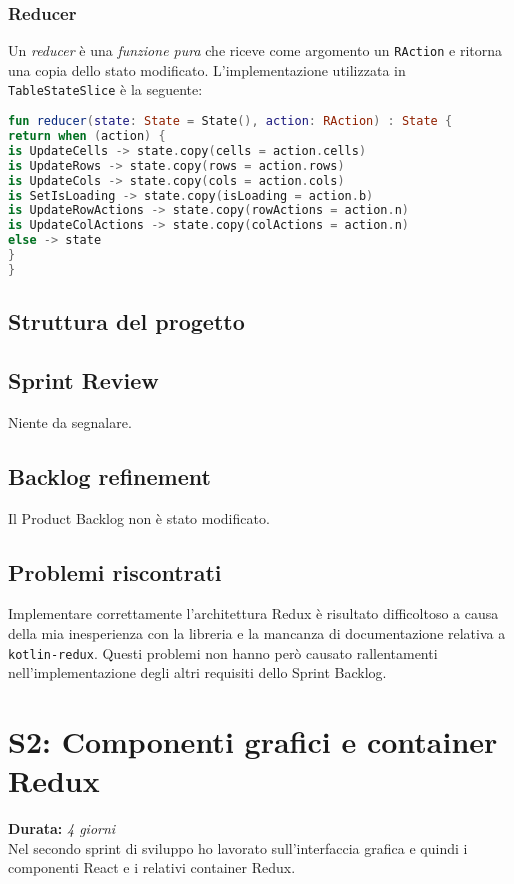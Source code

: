 \subsubsection{Reducer}
Un \emph{reducer} è una \emph{funzione pura} che riceve come argomento un \verb|RAction| e ritorna una copia dello stato modificato. L'implementazione utilizzata in \verb|TableStateSlice| è la seguente:
\begin{lstlisting}[caption={Reducer}, label={lst:bodycells}, language=Kotlin]
fun reducer(state: State = State(), action: RAction) : State {
return when (action) {
is UpdateCells -> state.copy(cells = action.cells)
is UpdateRows -> state.copy(rows = action.rows)
is UpdateCols -> state.copy(cols = action.cols)
is SetIsLoading -> state.copy(isLoading = action.b)
is UpdateRowActions -> state.copy(rowActions = action.n)
is UpdateColActions -> state.copy(colActions = action.n)
else -> state
}
}
\end{lstlisting}

\subsection{Struttura del progetto}
\subsection{Sprint Review}
Niente da segnalare.

\subsection{Backlog refinement}
Il Product Backlog non è stato modificato.

\subsection{Problemi riscontrati}
Implementare correttamente l'architettura Redux è risultato difficoltoso a causa della mia inesperienza con la libreria e la mancanza di documentazione relativa a \verb|kotlin-redux|. Questi problemi non hanno però causato rallentamenti nell'implementazione degli altri requisiti dello Sprint Backlog.

\newpage

\section{S2: Componenti grafici e container Redux}
\textbf{Durata:} \textit{4 giorni} \\
Nel secondo sprint di sviluppo ho lavorato sull'interfaccia grafica e quindi i componenti React e i relativi container Redux.


